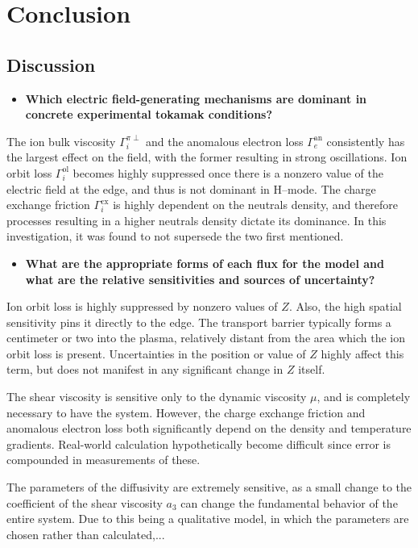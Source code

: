 \chapter{Conclusion} \label{chapter:conclusion}
\section{Discussion} \label{sec:discussion}
\begin{itemize}
	\item \textbf{Which electric field-generating mechanisms are dominant in concrete experimental tokamak conditions?}
\end{itemize}

The ion bulk viscosity $\Gamma_i^{\pi\perp}$ and the anomalous electron loss $\Gamma_e^\text{an}$ consistently has the largest effect on the field, with the former resulting in strong oscillations.
Ion orbit loss $\Gamma_i^\text{ol}$ becomes highly suppressed once there is a nonzero value of the electric field at the edge, and thus is not dominant in H--mode.
The charge exchange friction $\Gamma_i^\text{cx}$ is highly dependent on the neutrals density, and therefore processes resulting in a higher neutrals density dictate its dominance.
In this investigation, it was found to not supersede the two first mentioned.


\begin{itemize}
	\item \textbf{What are the appropriate forms of each flux for the model and what are the relative sensitivities and sources of uncertainty?}
\end{itemize}

Ion orbit loss is highly suppressed by nonzero values of $Z$.
Also, the high spatial sensitivity pins it directly to the edge.
The transport barrier typically forms a centimeter or two into the plasma, relatively distant from the area which the ion orbit loss is present.
Uncertainties in the position or value of $Z$ highly affect this term, but does not manifest in any significant change in $Z$ itself.

The shear viscosity is sensitive only to the dynamic viscosity $\mu$, and is completely necessary to have the system.
However, the charge exchange friction and anomalous electron loss both significantly depend on the density and temperature gradients.
Real-world calculation hypothetically become difficult since error is compounded in measurements of these.

The parameters of the diffusivity are extremely sensitive, as a small change to the coefficient of the shear viscosity $a_3$ can change the fundamental behavior of the entire system.
Due to this being a qualitative model, in which the parameters are chosen rather than calculated,...


